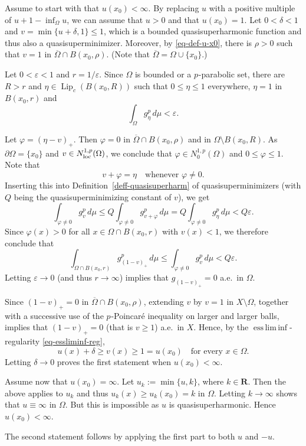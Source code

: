 \documentclass[a4paper,twoside]{article}
\makeatletter
\theoremstyle{propositional}
\theoremstyle{descriptive}
\theoremstyle{remarkstyle}
\renewenvironment{proof}[1][\proofname]{\par
  \pushQED{\qed}%
  \normalfont
  \trivlist
  \item[\hskip\labelsep
        \itshape
    #1\@addpunct{.}]\ignorespaces
}{%
  \popQED\endtrivlist\@endpefalse
}
\newcommand{\setm}{\setminus}
\DeclareMathOperator{\Lip}{Lip}
\DeclareMathOperator*{\essliminf}{ess\,lim\,inf}
\newcommand{\bdry}{\partial}
\newcommand{\bdy}{\bdry}
\newcommand{\loc}{_{\rm loc}}
\newcommand{\Om}{\Omega}
\renewcommand{\phi}{\varphi}
\newcommand{\eps}{\varepsilon}
\newcommand{\de}{\delta}
\newcommand{\p}{{$p\mspace{1mu}$}}
\newcommand{\R}{\mathbf{R}}
\newcommand{\Np}{N^{1,p}}
\newcommand{\Nploc}{N^{1,p}\loc}
\newcommand{\clOm}{{\overline{\Om}}}
\numberwithin{equation}{section}
\makeatother
\begin{document}
\begin{proof}
Assume to start with that $u(x_0)<\infty$.
By replacing $u$ with a positive multiple of $u+1-\inf_{\Om} u$,
we can assume that $u>0$ and that $u(x_0)=1$. 
Let $0 < \de <1$ and  $v=\min\{u+\de,1\}\le1$,  which is a 
bounded quasisuperharmonic function and thus also a quasisuperminimizer.
Moreover, by \eqref{eq-def-u-x0}, there is $\rho>0$ such that $v=1$ 
in $\clOm \cap B(x_0,\rho)$.
(Note that $\clOm = \Om\cup\{x_0\}$.)

Let $0 < \eps< 1$  and $r=1/\eps $.
Since $\Om$ is bounded or  a \p-parabolic set, there are $R>r$
and $\eta\in \Lip_c(B(x_0,R))$ such that $0\le \eta\le1$ everywhere,
$\eta=1$ in $B(x_0,r)$ and 
\begin{equation*} %
\int_\Om g_\eta^p \,d\mu < \eps.
\end{equation*}

Let  $\phi = (\eta-v)_+$.
Then $\phi=0$ in $\clOm \cap B(x_0,\rho)$
and in $\Om\setm B(x_0,R)$. 
As $\bdy \Om =\{x_0\}$ and $v \in \Nploc(\Om)$, we conclude that 
$\phi \in \Np_0(\Om)$ 
and $0 \le \phi\le 1$. 
Note that
\[
v+\phi = \eta \quad \text{whenever } \phi\ne0.
\]
Inserting this into 
Definition~\ref{deff-quasisuperharm} of quasisuperminimizers 
(with $Q$ being the quasisuperminimizing constant of $v$),
we get
\[
\int_{\phi\ne0} g_v^p \,d\mu \le Q \int_{\phi\ne0} g_{v+\phi}^p \,d\mu 
= Q \int_{\phi\ne0} g_\eta^p \,d\mu< Q\eps.
\]
Since $\phi(x)>0$ for all $x\in \Om \cap B(x_0,r)$ with $v(x)<1$, 
we therefore conclude that
\[
\int_{\Om\cap B(x_0,r)} g_{(1-v)_+}^p \,d\mu 
\le \int_{\phi\ne0} g_v^p \,d\mu
< Q\eps.
\]
Letting $\eps\to0$ (and thus $r\to\infty$) implies that 
$g_{(1-v)_+}=0$ a.e.\ in $\Om$.

Since $(1-v)_+=0$ in  $\clOm \cap B(x_0,\rho)$,
extending $v$ by $v=1$ in  $X \setm \Om$, together with 
a successive use of the \p-Poincar\'e inequality on larger
and larger balls, 
implies that $(1-v)_+=0$ (that is  $v\ge 1$) a.e.\ in  $X$.
Hence, by 
the $\essliminf$-regularity \eqref{eq-essliminf-reg},
\[
  u(x)+\de \ge v(x)\ge 1 = u(x_0) \quad \text{for every } x \in \Om.
\]
Letting $\de \to 0$ proves the first statement when $u(x_0)<\infty$.

Assume now 
that $u(x_0)=\infty$.
Let $u_k:=\min\{u,k\}$, where $k \in \R$.
Then the above applies to $u_k$ and thus
$u_k(x) \ge u_k(x_0) =k$ in $\Om$. 
Letting $k \to \infty$ shows that 
$u \equiv \infty$ in $\Om$.
But this is impossible as $u$ is quasisuperharmonic.
Hence $u(x_0)<\infty$.

The second statement follows by applying the first part to  both $u$ and $-u$.
\end{proof}
\end{document}
